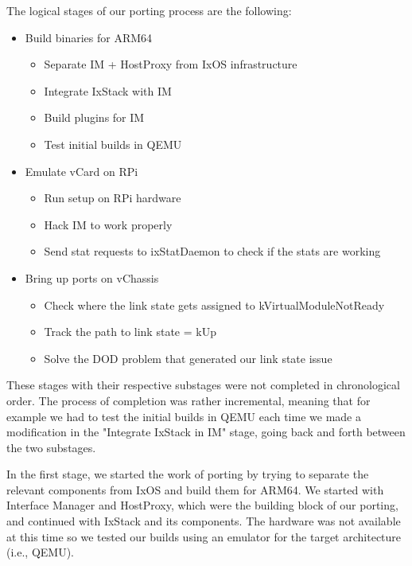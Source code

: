 The logical stages of our porting process are the following:
\begin{itemize}
    \item Build binaries for ARM64
    \begin{itemize}
        \item Separate IM + HostProxy from IxOS infrastructure
        \item Integrate IxStack with IM
        \item Build plugins for IM
        \item Test initial builds in QEMU
    \end{itemize}
    \item Emulate vCard on RPi
    \begin{itemize}
        \item Run setup on RPi hardware
        \item Hack IM to work properly
        \item Send stat requests to ixStatDaemon to check if the stats are working
    \end{itemize}
    \item Bring up ports on vChassis
    \begin{itemize}
        \item Check where the link state gets assigned to kVirtualModuleNotReady
        \item Track the path to link state = kUp
        \item Solve the DOD problem that generated our link state issue
    \end{itemize}
\end{itemize}
These stages with their respective substages were not completed in chronological
order. The process of completion was rather incremental, meaning that for
example we had to test the initial builds in QEMU each time we made a
modification in the "Integrate IxStack in IM" stage, going back and forth
between the two substages.

In the first stage, we started the work of porting by trying to separate the
relevant components from IxOS and build them for ARM64. We started with
Interface Manager  and HostProxy, which were the building block of our porting,
and continued with IxStack and its components. The hardware was not available
at this time so we tested our builds using an emulator for the target
architecture (i.e., QEMU).

